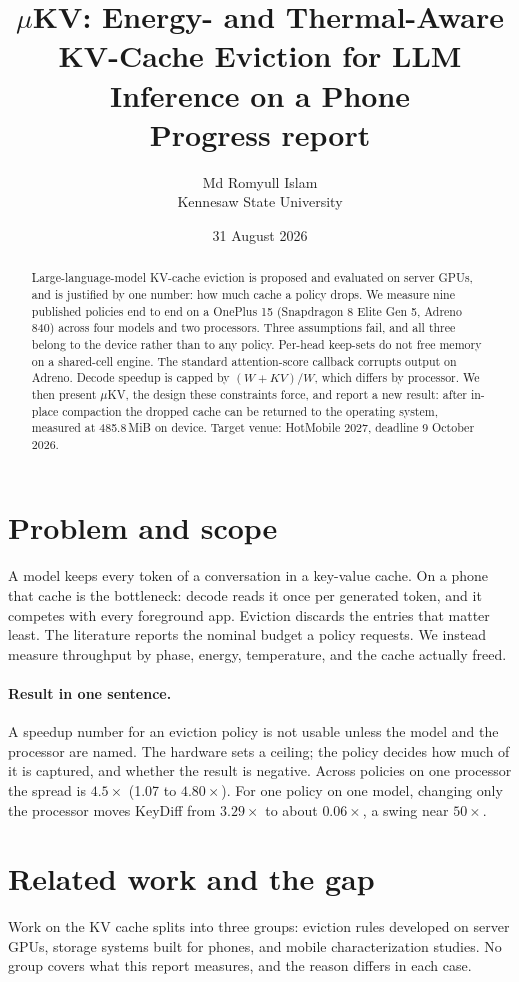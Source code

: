 \documentclass[11pt]{article}
\title{\vspace{-2.5em}\textbf{$\mu$KV: Energy- and Thermal-Aware\\ KV-Cache Eviction for LLM Inference on a Phone}\\[.3em]
\large Progress report}
\author{Md Romyull Islam\\\small Kennesaw State University}
\date{\small 31 August 2026}
\begin{document}
\maketitle
\vspace{-1.5em}

\begin{abstract}
\noindent
Large-language-model KV-cache eviction is proposed and evaluated on server GPUs, and is
justified by one number: how much cache a policy drops. We measure nine published policies
end to end on a OnePlus 15 (Snapdragon 8 Elite Gen 5, Adreno 840) across four models and two
processors. Three assumptions fail, and all three belong to the device rather than to any
policy. Per-head keep-sets do not free memory on a shared-cell engine. The standard
attention-score callback corrupts output on Adreno. Decode speedup is capped by
$(W{+}KV)/W$, which differs by processor. We then present $\mu$KV, the design these
constraints force, and report a new result: after in-place compaction the dropped cache can
be returned to the operating system, measured at 485.8\,MiB on device.
Target venue: HotMobile 2027, deadline 9 October 2026.
\end{abstract}

\section{Problem and scope}
A model keeps every token of a conversation in a key-value cache. On a phone that cache is
the bottleneck: decode reads it once per generated token, and it competes with every
foreground app. Eviction discards the entries that matter least. The literature reports the
nominal budget a policy requests. We instead measure throughput by phase, energy,
temperature, and the cache actually freed.

\paragraph{Result in one sentence.}
A speedup number for an eviction policy is not usable unless the model and the processor are
named. The hardware sets a ceiling; the policy decides how much of it is captured, and
whether the result is negative. Across policies on one processor the spread is $4.5\times$
(1.07 to $4.80\times$). For one policy on one model, changing only the processor moves KeyDiff from $3.29\times$ to about $0.06\times$, a swing near $50\times$.

\section{Related work and the gap}
Work on the KV cache splits into three groups: eviction rules developed on server GPUs,
storage systems built for phones, and mobile characterization studies. No group covers what
this report measures, and the reason differs in each case.
\end{document}
